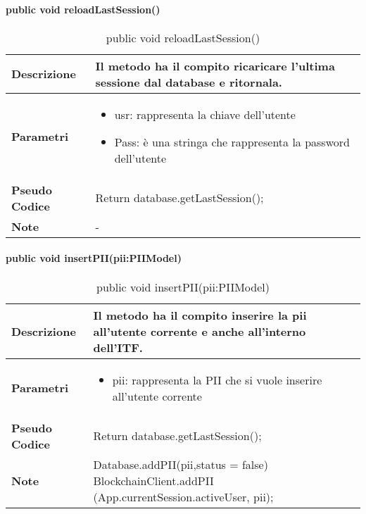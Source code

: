 \paragraph{public void reloadLastSession()}
\begin{center}
    \begin{longtable}{|p{3cm}|p{9cm}|}%
    \caption{public void reloadLastSession()}
    \endfirsthead
    \endhead
    \hline
    \textbf{Descrizione} & Il metodo ha il compito ricaricare l’ultima sessione dal database e ritornala.\\
    \hline
    \textbf{Parametri} &      
    \begin{itemize}
        \item  usr: rappresenta la chiave dell’utente
        \item Pass: è una stringa che rappresenta la password dell’utente
    \end{itemize}
    \\
    \hline
    \textbf{Pseudo Codice} & 
    Return database.getLastSession();
    \\
    \hline
    \textbf{Note} & 
    -
    \\
    \hline
    \end{longtable}
    \end{center}



\paragraph{public void insertPII(pii:PIIModel)}
\begin{center}
    \begin{longtable}{|p{3cm}|p{9cm}|}%
    \caption{public void insertPII(pii:PIIModel)}
    \endfirsthead
    \endhead
    \hline
    \textbf{Descrizione} & Il metodo ha il compito inserire la pii all’utente corrente e anche all’interno dell’ITF.\\
    \hline
    \textbf{Parametri} &      
    \begin{itemize}
        \item pii: rappresenta la PII che si vuole inserire all’utente corrente
    \end{itemize}
    \\
    \hline
    \textbf{Pseudo Codice} & 
    Return database.getLastSession();
    \\
    \hline
    \textbf{Note} & 
    Database.addPII(pii,status = false)\newline
    BlockchainClient.addPII\newline
    (App.currentSession.activeUser, pii);\newline
    \\
    \hline
    \end{longtable}
    \end{center}


